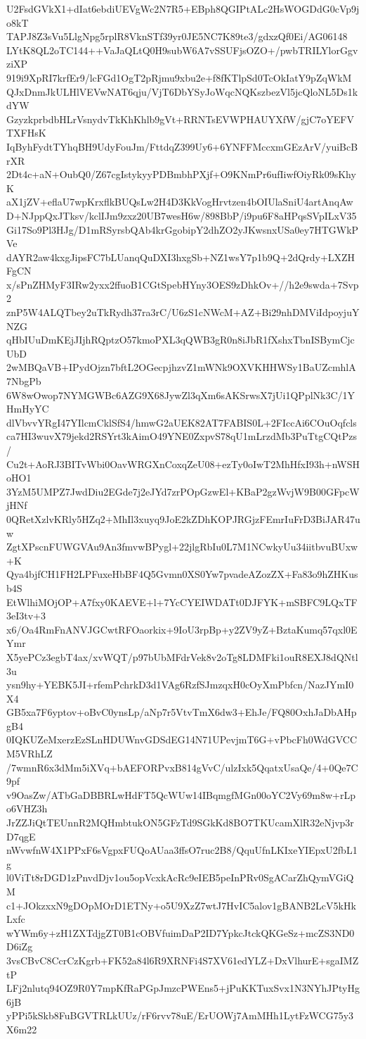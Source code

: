 U2FsdGVkX1+dIat6ebdiUEVgWc2N7R5+EBph8QGIPtALc2HsWOGDdG0cVp9jo8kT
TAPJ8Z3sVu5LlgNpg5rplR8VknSTf39yr0JE5NC7K89te3/gdxzQf0Ei/AG06148
LYtK8QL2oTC144++VaJaQLtQ0H9subW6A7vSSUFjsOZO+/pwbTRILYlorGgvziXP
919i9XpRI7krfEr9/lcFGd1OgT2pRjmu9xbu2e+f8fKTlpSd0TcOkIatY9pZqWkM
QJxDnmJkULHlVEVwNAT6qju/VjT6DbYSyJoWqcNQKszbezVl5jcQloNL5Ds1kdYW
GzyzkprbdbHLrVsnydvTkKhKhlb9gVt+RRNTsEVWPHAUYXfW/gjC7oYEFVTXFHsK
IqByhFydtTYhqBH9UdyFouJm/FttdqZ399Uy6+6YNFFMccxmGEzArV/yuiBcBrXR
2Dt4c+aN+OubQ0/Z67cgIstykyyPDBmbhPXjf+O9KNmPr6ufIiwfOiyRk09sKhyK
aX1jZV+eflaU7wpKrxflkBUQsLw2H4D3KkVogHrvtzen4bOIUlaSniU4artAnqAw
D+NJppQxJTksv/kclIJm9zxz20UB7wesH6w/898BbP/i9pu6F8aHPqsSVpILxV35
Gi17So9Pl3HJg/D1mRSyrsbQAb4krGgobipY2dhZO2yJKwsnxUSa0ey7HTGWkPVe
dAYR2aw4kxgJipsFC7bLUanqQuDXI3hxgSb+NZ1wsY7p1b9Q+2dQrdy+LXZHFgCN
x/sPnZHMyF3IRw2yxx2ffuoB1CGtSpebHYny3OES9zDhkOv+//h2e9swda+7Svp2
znP5W4ALQTbey2uTkRydh37ra3rC/U6zS1cNWcM+AZ+Bi29nhDMViIdpoyjuYNZG
qHbIUuDmKEjJIjhRQptzO57kmoPXL3qQWB3gR0n8iJbR1fXshxTbnISBymCjcUbD
2wMBQaVB+IPydOjzn7bftL2OGecpjhzvZ1mWNk9OXVKHHWSy1BaUZcmhlA7NbgPb
6W8wOwop7NYMGWBc6AZG9X68JywZl3qXm6sAKSrwsX7jUi1QPplNk3C/1YHmHyYC
dlVbvvYRgI47YIlcmCklSfS4/hmwG2aUEK82AT7FABIS0L+2FIccAi6COuOqfcls
ca7HI3wuvX79jekd2RSYrt3kAimO49YNE0ZxpvS78qU1mLrzdMb3PuTtgCQtPzs/
Cu2t+AoRJ3BITvWbi0OavWRGXnCoxqZeU08+ezTy0oIwT2MhHfxI93h+nWSHoHO1
3YzM5UMPZ7JwdDiu2EGde7j2eJYd7zrPOpGzwEl+KBaP2gzWvjW9B00GFpcWjHNf
0QRetXzlvKRly5HZq2+MhIl3xuyq9JoE2kZDhKOPJRGjzFEmrIuFrD3BiJAR47uw
ZgtXPscnFUWGVAu9An3fmvwBPygl+22jlgRbIu0L7M1NCwkyUu34iitbvuBUxw+K
Qya4bjfCH1FH2LPFuxeHbBF4Q5Gvmn0XS0Yw7pvadeAZozZX+Fa83o9hZHKusb4S
EtWlhiMOjOP+A7fxy0KAEVE+l+7YcCYEIWDATt0DJFYK+mSBFC9LQxTF3eI3tv+3
x6/Oa4RmFnANVJGCwtRFOaorkix+9IoU3rpBp+y2ZV9yZ+BztaKumq57qxl0EYmr
X5yePCz3egbT4ax/xvWQT/p97bUbMFdrVek8v2oTg8LDMFki1ouR8EXJ8dQNtl3u
ysn9hy+YEBK5JI+rfemPchrkD3d1VAg6RzfSJmzqxH0cOyXmPbfcn/NazJYmI0X4
GB5xa7F6yptov+oBvC0ynsLp/aNp7r5VtvTmX6dw3+EhJe/FQ80OxhJaDbAHpgB4
0IQKUZeMxerzEzSLnHDUWnvGDSdEG14N71UPevjmT6G+vPbcFh0WdGVCCM5VRhLZ
/7wmnR6x3dMm5iXVq+bAEFORPvxB814gVvC/ulzIxk5QqatxUsaQe/4+0Qe7C9pf
v9OasZw/ATbGaDBBRLwHdFT5QcWUw14IBqmgfMGn00oYC2Vy69m8w+rLpo6VHZ3h
JrZZJiQtTEUnnR2MQHmbtukON5GFzTd9SGkKd8BO7TKUcamXlR32eNjvp3rD7qgE
nWvwfnW4X1PPxF6sVgpxFUQoAUaa3ffsO7ruc2B8/QquUfnLKIxeYIEpxU2fbL1g
l0ViTt8rDGD1zPnvdDjv1ou5opVcxkAcRc9eIEB5peInPRv0SgACarZhQymVGiQM
c1+JOkzxxN9gDOpMOrD1ETNy+o5U9XzZ7wtJ7HvIC5alov1gBANB2LcV5kHkLxfc
wYWm6y+zH1ZXTdjgZT0B1cOBVfuimDaP2ID7YpkcJtckQKGeSz+mcZS3ND0D6iZg
3vsCBvC8CcrCzKgrb+FK52a84l6R9XRNFi4S7XV61edYLZ+DxVlhurE+sgaIMZtP
LFj2nlutq94OZ9R0Y7mpKfRaPGpJmzcPWEns5+jPuKKTuxSvx1N3NYhJPtyHg6jB
yPPi5kSkb8FuBGVTRLkUUz/rF6rvv78uE/ErUOWj7AmMHh1LytFzWCG75y3X6m22
